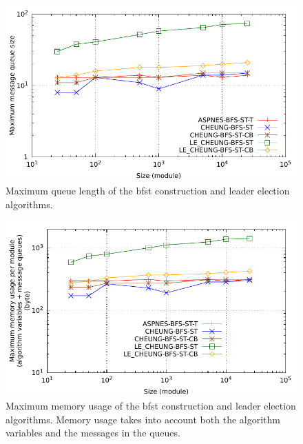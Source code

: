 \begin{figure}[!h]
	\centering
	\includegraphics[width=\gnuplotGraphWidth]{images/centrality/ub/queue}
	\caption{Maximum queue length of the \gls{bfst} construction and leader election algorithms.}
	\label{fig:centrality:bfs-queue}
\end{figure}

\begin{figure}[!h]
	\centering
	\includegraphics[width=\gnuplotGraphWidth]{images/centrality/ub/memory}
	\caption{Maximum memory usage of the \gls{bfst} construction and leader election algorithms. Memory usage takes into account both the algorithm variables and the messages in the queues.}
	\label{fig:centrality:bfs-memory}
\end{figure}


